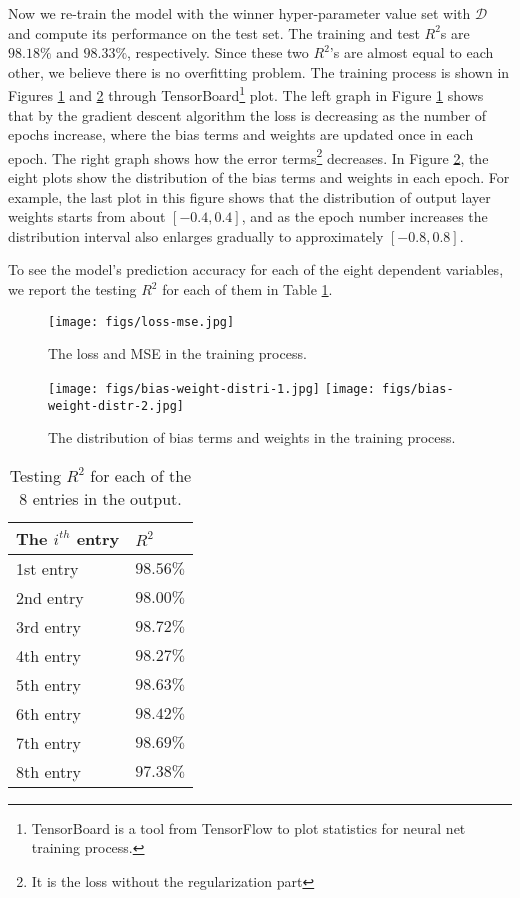 \documentclass[thmsa,onecolumn,12pt]{article}%
\begin{document}
Now we re-train the model with the winner hyper-parameter value set with $\mathcal{D}$ and compute its performance on the test set. The training and test $R^2$s are $98.18\%$ and $98.33\%$, respectively. Since these two $R^2$'s are almost equal to each other, we believe there is no overfitting problem. The training process is shown in Figures \ref{Fig:loss} and \ref{Fig:weight} through TensorBoard\footnote{TensorBoard is a tool from TensorFlow to plot statistics for neural net training process.} plot. The left graph in Figure \ref{Fig:loss} shows that by the gradient descent algorithm the loss is decreasing as the number of epochs increase, where the bias terms and weights are updated once in each epoch. The right graph shows how the error terms\footnote{It is the loss without the regularization part} decreases. In Figure \ref{Fig:weight}, the eight plots show the distribution of the bias terms and weights in each epoch. For example, the last plot in this figure shows that the distribution of output layer weights starts from about $[-0.4, 0.4]$, and as the epoch number increases the distribution interval also enlarges gradually to approximately $[-0.8, 0.8]$.




To see the model's prediction accuracy for each of the eight dependent variables, we report the testing $R^2$ for each of them in Table \ref{table3}.

\begin{figure}[!htb]
	\centering
		\texttt{[image: figs/loss-mse.jpg]}
\caption{The loss and MSE in the training process. }
\label{Fig:loss}
\end{figure}

\begin{figure}[!htb]
	\centering
		\texttt{[image: figs/bias-weight-distri-1.jpg]}
		\texttt{[image: figs/bias-weight-distr-2.jpg]}
\caption{The distribution of bias terms and weights in the training process.}
\label{Fig:weight}
\end{figure}


\begin{table}[H]%
\caption{Testing $R^2$ for each of the 8 entries in the output.}
\label{table3}
\centering%
\begin{tabular}{ p{5cm}  p{5cm}  }
\toprule%
The $i^{th}$ entry & $R^2$  \\
\toprule
1st entry & $98.56\%$\\
2nd entry & $98.00\%$\\
3rd entry & $98.72\%$\\
4th entry & $98.27\%$\\
5th entry & $98.63\%$\\
6th entry & $98.42\%$\\
7th entry & $98.69\%$\\
8th entry & $97.38\%$\\

\bottomrule
\end{tabular}
\end{table}
\end{document}
